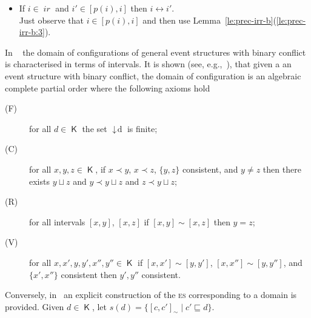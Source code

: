 \documentclass[conference]{IEEEtran}
\renewenvironment{proof}{\begin{IEEEproof}}{\end{IEEEproof}}
\newcommand{\compact}[1]{\ensuremath{\mathop{\mathsf{K}({#1})}}}
\newcommand{\principal}[1]{\ensuremath{\mathop{\downarrow\!{#1}}}}
\newcommand{\ir}[1]{\ensuremath{\mathop{\mathit{ir}({#1})}}}
\newcommand{\esabbr}{\textsc{es}}
\newcommand{\pred}[1]{\ensuremath{\mathit{p}({#1})}}
\newcommand{\dint}[2]{\ensuremath{[{#1},{#2}]}}
\begin{document}
\begin{proof}
\begin{itemize}
    
  \item If $i \in \ir{D}$ and $i' \in \dint{\pred{i}}{i}$ then
    $i \leftrightarrow i'$.\\
    Just observe that $i \in \dint{\pred{i}}{i}$ and then use
    Lemma~\ref{le:prec-irr-b}(\ref{le:prec-irr-b:3}).
  \end{itemize}
  
\end{proof}


In ~\cite{Winskel:phd,Dro:ESD} the domain of
configurations of general event structures with binary conflict is characterised in terms of intervals. It is shown (see, e.g.,~\cite[Theorem 3.3.3]{Winskel:phd}), that given a an event structure with binary conflict, the domain of configuration is an 
algebraic complete partial order where the
following axioms hold

\begin{description}
\item[(F)] for all $d \in \compact{D}$ the set $\principal{d}$ is finite;

\item[(C)] for all $x, y, z \in \compact{D}$, if $x \prec y$,
  $x \prec z$, $\{y, z\}$ consistent, and $y \neq z$ then there exists
  $y \sqcup z$ and $y \prec y \sqcup z$ and $z \prec y \sqcup z$;

\item[(R)] for all intervals $\dint{x}{y}$, $\dint{x}{z}$ if
  $\dint{x}{y} \sim \dint{x}{z}$ then $y=z$;


\item[(V)] for all $x,x',y,y',x'',y'' \in \compact{D}$ if
  $\dint{x}{x'} \sim \dint{y}{y'}$, $\dint{x}{x''} \sim \dint{y}{y''}$, and $\{x',x''\}$
  consistent then $y',y''$ consistent.
\end{description}


Conversely, in~\cite{Dro:ESD} an explicit construction of the {\esabbr} corresponding to
a domain is provided. Given
$d \in \compact{D}$, let
$s(d) = \{ \dint{c}{c'}_{\sim} \mid c' \sqsubseteq d \}$.
\end{document}
